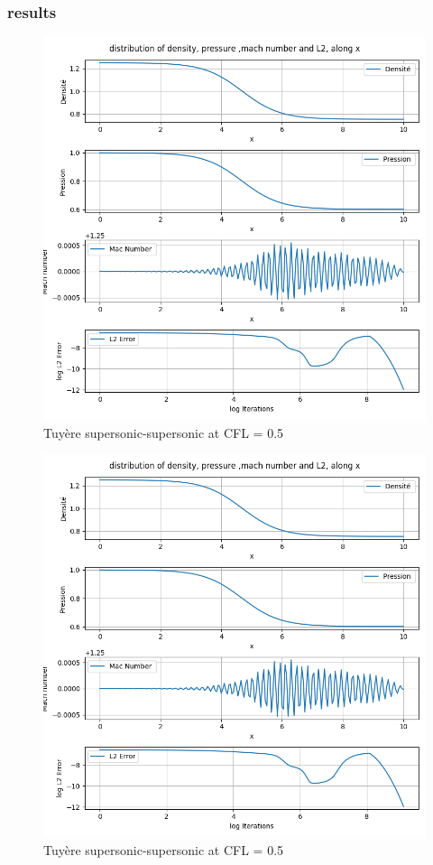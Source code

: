 \documentclass[12pt]{article}
\begin{document}
\subsubsection{results}
\begin{figure}[H] %
    \centering
    \includegraphics[width=\textwidth,height=\textheight,keepaspectratio]{PLOTS/Tuyere_super_super_Macormack_CFL050.png}
    \caption{Tuyère supersonic-supersonic at CFL = 0.5}
    \label{fig:your_label}
\end{figure}
\begin{figure}[H] %
    \centering
    \includegraphics[width=\textwidth,height=\textheight,keepaspectratio]{PLOTS/Tuyere_super_super_Macormack_CFL050.png}
    \caption{Tuyère supersonic-supersonic at CFL = 0.5}
    \label{fig:your_label}
\end{figure}
\end{document}
